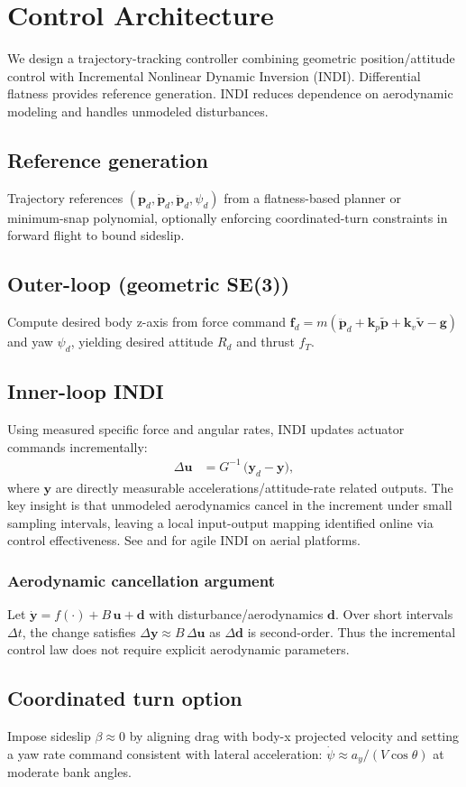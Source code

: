 
\chapter{Control Architecture}\label{chapter:control-architecture}

We design a trajectory-tracking controller combining geometric position/attitude control with Incremental Nonlinear Dynamic Inversion (INDI). Differential flatness provides reference generation. INDI reduces dependence on aerodynamic modeling and handles unmodeled disturbances.

\section{Reference generation}
Trajectory references $(\mathbf{p}_d,\dot{\mathbf{p}}_d,\ddot{\mathbf{p}}_d,\psi_d)$ from a flatness-based planner or minimum-snap polynomial, optionally enforcing coordinated-turn constraints in forward flight to bound sideslip.

\section{Outer-loop (geometric SE(3))}
Compute desired body z-axis from force command $\mathbf{f}_d=m(\ddot{\mathbf{p}}_d + \mathbf{k}_p\tilde{\mathbf{p}} + \mathbf{k}_v\tilde{\mathbf{v}} - \mathbf{g})$ and yaw $\psi_d$, yielding desired attitude $R_d$ and thrust $f_T$.

\section{Inner-loop INDI}
Using measured specific force and angular rates, INDI updates actuator commands incrementally:
\begin{align}
\Delta \mathbf{u} &= G^{-1}\,\big( \mathbf{y}_d - \mathbf{y} \big),
\end{align}
where $\mathbf{y}$ are directly measurable accelerations/attitude-rate related outputs. The key insight is that unmodeled aerodynamics cancel in the increment under small sampling intervals, leaving a local input-output mapping identified online via control effectiveness. See \cite{Smeur2016, Oosedo2017, vanKampen2018} and \cite{Tzoumanikas2021} for agile INDI on aerial platforms.

\subsection{Aerodynamic cancellation argument}
Let $\dot{\mathbf{y}}=f(\cdot)+B\,\mathbf{u}+\mathbf{d}$ with disturbance/aerodynamics $\mathbf{d}$. Over short intervals $\Delta t$, the change satisfies $\Delta \mathbf{y} \approx B\,\Delta\mathbf{u}$ as $\Delta \mathbf{d}$ is second-order. Thus the incremental control law does not require explicit aerodynamic parameters.

\section{Coordinated turn option}
Impose sideslip $\beta\approx0$ by aligning drag with body-x projected velocity and setting a yaw rate command consistent with lateral acceleration: $\dot{\psi}\approx a_y/(V\cos\theta)$ at moderate bank angles.
